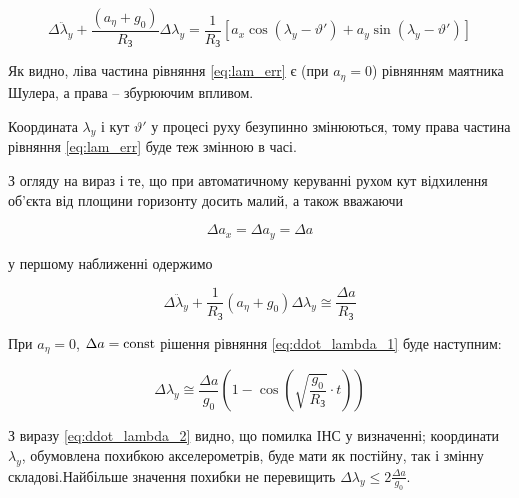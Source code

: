 \begin{equation} 
\label{eq:lam_err} 
\Delta \ddot{\lambda }_{y} +\frac{(a_{\eta } +g_{0} )}{R_{{\text{З}}} } 
\Delta \lambda _{y} =\frac{1}{R_{{\text{З}}} } \left[a_{x} \cos (\lambda _{y} -\vartheta ')+a_{y} \sin (\lambda _{y} -
\vartheta ')\right] 
\end{equation} 

Як видно, ліва частина рівняння \eqref{eq:lam_err} є (при $a_{\eta } =0$) рівнянням маятника Шулера, а права -- збурюючим впливом.

Координата $\lambda _{y} $ і кут $\vartheta '$ у процесі руху безупинно змінюються, тому права частина рівняння \eqref{eq:lam_err} 
буде теж змінною в часі.

З огляду на вираз і те, що при автоматичному керуванні рухом кут відхилення об'єкта від площини горизонту досить малий, а також вважаючи

\[\Delta a_{x} =\Delta a_{y} =\Delta a\] 

у першому наближенні одержимо

\begin{equation} 
\label{eq:ddot_lambda_1} 
\Delta \ddot{\lambda }_{y} +\frac{1}{R_{{\text{З}}} } (a_{\eta } +g_{0} )\Delta \lambda _{y} \cong \frac{\Delta a}{R_{{\text{З}}} }  
\end{equation} 

При $a_{\eta } =0$, $\Delta a={\rm const}$ рішення рівняння \eqref{eq:ddot_lambda_1} буде наступним:

\begin{equation} 
\label{eq:ddot_lambda_2} 
\Delta \lambda _{y} \cong \frac{\Delta a}{g_{0} } \left(1-\cos \left(\sqrt{\frac{g_{0} }{R_{{\text{З}}} } } \cdot t\right)\right) 
\end{equation} 

З виразу \eqref{eq:ddot_lambda_2} видно, що помилка ІНС у визначенні; координати $\lambda _{y} $, обумовлена похибкою акселерометрів, 
буде мати як постійну, так і змінну складові.Найбільше значення похибки не перевищить  $\Delta \lambda _{y} \le 2\frac{\Delta a}{g_{0} } $. 




